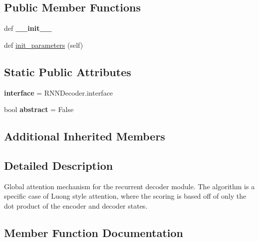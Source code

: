 \subsection*{Public Member Functions}
\begin{DoxyCompactItemize}
\item 
def {\bfseries \+\_\+\+\_\+init\+\_\+\+\_\+}\hypertarget{classrnn_1_1DotAttentionRNNDecoder_a6eea546565f762ee83ff51c28e1645d4}{}\label{classrnn_1_1DotAttentionRNNDecoder_a6eea546565f762ee83ff51c28e1645d4}

\item 
def \hyperlink{classrnn_1_1DotAttentionRNNDecoder_a0bbac7d4dc05b35c0873c6d0074d6499}{init\+\_\+parameters} (self)
\end{DoxyCompactItemize}
\subsection*{Static Public Attributes}
\begin{DoxyCompactItemize}
\item 
{\bfseries interface} = R\+N\+N\+Decoder.\+interface\hypertarget{classrnn_1_1DotAttentionRNNDecoder_a8f77e3e523eaf8d375280e22818a72e0}{}\label{classrnn_1_1DotAttentionRNNDecoder_a8f77e3e523eaf8d375280e22818a72e0}

\item 
bool {\bfseries abstract} = False\hypertarget{classrnn_1_1DotAttentionRNNDecoder_a6b36fac841800f586bbfa7670003d669}{}\label{classrnn_1_1DotAttentionRNNDecoder_a6b36fac841800f586bbfa7670003d669}

\end{DoxyCompactItemize}
\subsection*{Additional Inherited Members}


\subsection{Detailed Description}
\begin{DoxyVerb}Global attention mechanism for the recurrent decoder module. The algorithm is a specific case
of Luong style attention, where the scoring is based off of only the dot product of the
encoder and decoder states.
\end{DoxyVerb}
 

\subsection{Member Function Documentation}
